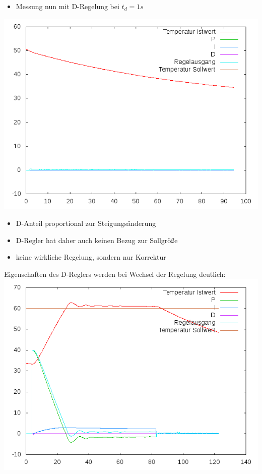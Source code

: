 \documentclass[compress,11pt]{beamer}
\begin{document}
\begin{frame}
\begin{itemize}
\item Messung nun mit D-Regelung bei $t_d = 1 s$
\end{itemize}
\includegraphics[width=.7\textwidth]{../2aufgabe/2etd1}
\end{frame}
\begin{frame}
\begin{itemize}
\item D-Anteil proportional zur Steigungsänderung
\item D-Regler hat daher auch keinen Bezug zur Sollgröße 
\item keine wirkliche Regelung, sondern nur Korrektur
\end{itemize}
\end{frame}
\begin{frame}
Eigenschaften des D-Reglers werden bei Wechsel der Regelung deutlich:\\
\includegraphics[width=.7\textwidth]{../2aufgabe/2et60Cd1}
\end{frame}
\end{document}
